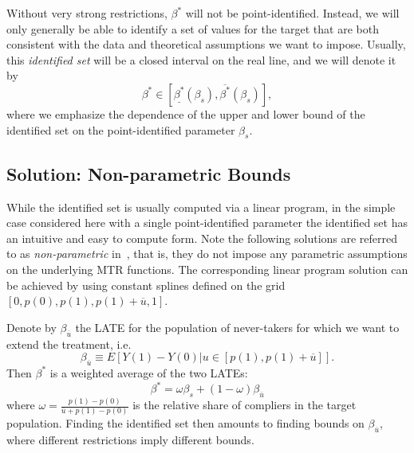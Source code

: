 \documentclass[12pt,a4paper,english]{article} %
\numberwithin{equation}{section}
\numberwithin{figure}{section}
\numberwithin{table}{section}
\begin{document}
Without very strong restrictions, $\beta^*$ will not be point-identified.
Instead, we will only generally be able to identify a set of values for the target that are both consistent with the data and theoretical assumptions we want to impose.
Usually, this \textit{identified set} will be a closed interval on the real line, and we will denote it by
\begin{equation*}
  \beta^* \in [\underline{\beta^*}(\beta_s), \overline{\beta^*}(\beta_s)],
\end{equation*}
where we emphasize the dependence of the upper and lower bound of the identified set on the point-identified parameter $\beta_s$.

\subsection{Solution: Non-parametric Bounds}
While the identified set is usually computed via a linear program, in the simple case considered here with a single point-identified parameter the identified set has an intuitive and easy to compute form.
Note the following solutions are referred to as \textit{non-parametric} in~\cite{mogstad2018using}, that is, they do not impose any parametric assumptions on the underlying MTR functions.
The corresponding linear program solution can be achieved by using constant splines defined on the grid $[0, p(0), p(1), p(1) + \overline{u}, 1]$.

Denote by $\beta_{\overline{u}}$ the LATE for the population of never-takers for which we want to extend the treatment, i.e.
\begin{equation*}
  \beta_{\overline{u}} \equiv E[Y(1) - Y(0) | u \in [p(1), p(1) + \overline{u}]].
\end{equation*}
Then $\beta^*$ is a weighted average of the two LATEs:\@
\begin{equation*}
  \beta^* = \omega\beta_s + (1-\omega)\beta_{\overline{u}}
\end{equation*}
where $\omega = \frac{p(1) - p(0)}{\overline{u} + p(1) - p(0)}$ is the relative share of compliers in the target population.
Finding the identified set then amounts to finding bounds on $\beta_{\overline{u}}$, where different restrictions imply different bounds.
\end{document}
